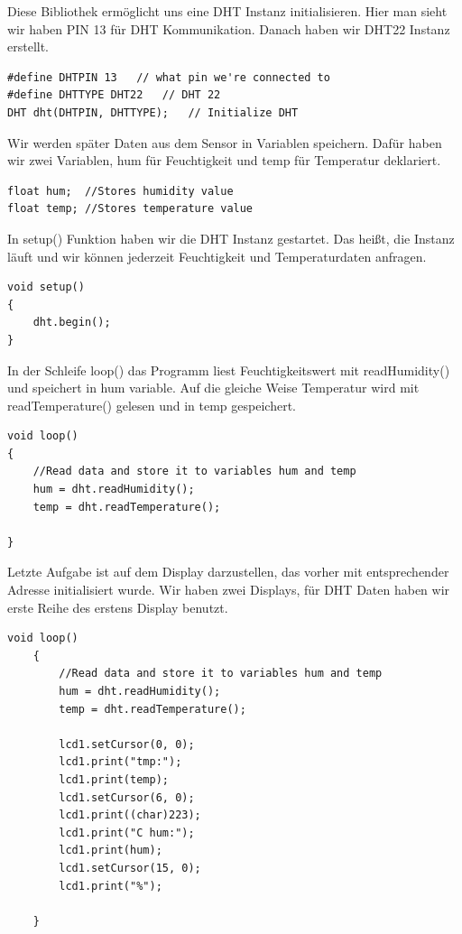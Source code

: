 \documentclass[conference]{IEEEtran}
\begin{document}
Diese Bibliothek ermöglicht uns eine DHT Instanz initialisieren. Hier man sieht wir haben PIN 13 für DHT Kommunikation. Danach haben wir DHT22 Instanz erstellt.

\begin{lstlisting}[style=CStyle]
#define DHTPIN 13	// what pin we're connected to
#define DHTTYPE DHT22	// DHT 22 
DHT dht(DHTPIN, DHTTYPE);	// Initialize DHT 
\end{lstlisting}

Wir werden später Daten aus dem Sensor in Variablen speichern. Dafür haben wir zwei Variablen, \textsf{hum} für Feuchtigkeit und \textsf{temp} für Temperatur deklariert. 

\begin{lstlisting}[style=CStyle]
float hum;	//Stores humidity value
float temp;	//Stores temperature value
\end{lstlisting}

In \textsf{setup()} Funktion haben wir die DHT Instanz gestartet. Das heißt, die Instanz läuft und wir können jederzeit Feuchtigkeit und Temperaturdaten anfragen. 

\begin{lstlisting}[style=CStyle]
void setup()
{
	dht.begin();
}
\end{lstlisting}

In der Schleife \textsf{loop()} das Programm liest Feuchtigkeitswert mit \textsf{readHumidity()} und speichert in \textsf{hum} variable. Auf die gleiche Weise Temperatur wird mit \textsf{readTemperature()} gelesen und in \textsf{temp} gespeichert. 

\begin{lstlisting}[style=CStyle]
void loop()
{
	//Read data and store it to variables hum and temp
	hum = dht.readHumidity();
	temp = dht.readTemperature();
	
}
\end{lstlisting}

Letzte Aufgabe ist auf dem Display darzustellen, das vorher  mit entsprechender Adresse initialisiert wurde. Wir haben zwei Displays, für DHT Daten haben wir erste Reihe des erstens Display benutzt. 

\begin{lstlisting}[style=CStyle]
	void loop()
	{
		//Read data and store it to variables hum and temp
		hum = dht.readHumidity();
		temp = dht.readTemperature();
		
		lcd1.setCursor(0, 0);
		lcd1.print("tmp:");
		lcd1.print(temp); 
		lcd1.setCursor(6, 0);
		lcd1.print((char)223);
		lcd1.print("C hum:");
		lcd1.print(hum);
		lcd1.setCursor(15, 0);
		lcd1.print("%");
		
	}
\end{lstlisting}
\end{document}
